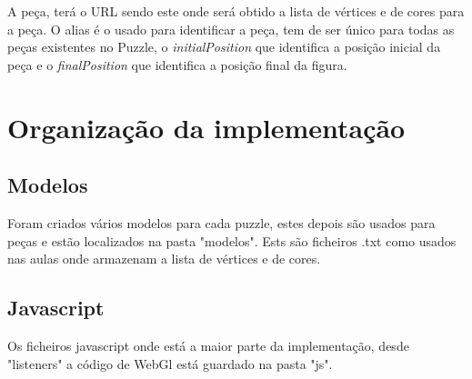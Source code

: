 \documentclass[pdftex,12pt,a4paper]{report}
\begin{document}
A peça, terá o URL sendo este onde será obtido a lista de vértices e de cores para a peça. O alias é o usado para identificar a peça, tem de ser único para todas as peças existentes no Puzzle, o \textit{initialPosition} que identifica a posição inicial da peça e o \textit{finalPosition} que identifica a posição final da figura.

\section{Organização da implementação}

\subsection{Modelos}

Foram criados vários modelos para cada puzzle, estes depois são usados para peças e estão localizados na pasta "modelos". Ests são ficheiros .txt como usados nas aulas onde armazenam a lista de vértices e de cores. 

\subsection{Javascript}

Os ficheiros javascript onde está a maior parte da implementação, desde "listeners" a código de WebGl está guardado na pasta "js".
\end{document}
